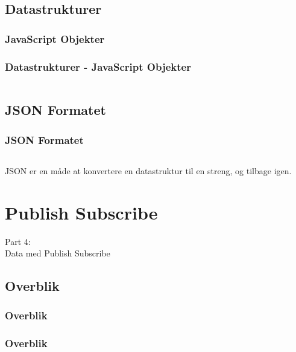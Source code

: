 \subsection{Datastrukturer}
\subsubsection{JavaScript Objekter}
\begin{frame}
    \frametitle{Datastrukturer - JavaScript Objekter}
    \vspace{-1mm}
    \inputminted[fontsize=\footnotesize]{javascript}{../src/frontend/part3_object/logic.js}
\end{frame}

\subsection{JSON Formatet}
\begin{frame}
    \frametitle{JSON Formatet}
    \vspace{-1mm}
    \inputminted[fontsize=\footnotesize,highlightlines={1}]{javascript}{../src/frontend/part3_json/logic.js}
    
    \pause
    \vspace{1mm}
    JSON er en måde at konvertere en datastruktur til en streng, og tilbage igen.
\end{frame}

\section{Publish Subscribe}
\begin{frame}
    \vspace{25mm}
    \begin{center}
        \Huge{Part 4:\\Data med Publish Subscribe}
    \end{center}
\end{frame}

\subsection{Overblik}
\begin{frame}
    \frametitle{Overblik}
    \vspace{10mm}
    \begin{center}
    \end{center}
\end{frame}
\begin{frame}
    \frametitle{Overblik}
    \vspace{10mm}
    \begin{center}
    \end{center}
\end{frame}

